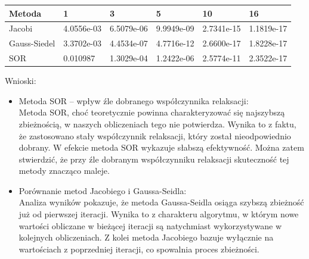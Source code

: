 \documentclass[a4paper, 11pt]{article}
\begin{document}
\begin{center}
\begin{tabular}{|l|l|l|l|l|l|}
\hline
Metoda       & 1          & 3          & 5          & 10         & 16         \\ \hline
Jacobi       & 4.0556e-03 & 6.5079e-06 & 9.9949e-09 & 2.7341e-15 & 1.1819e-17 \\ \hline
Gauss-Siedel & 3.3702e-03 & 4.4534e-07 & 4.7716e-12 & 2.6600e-17 & 1.8228e-17 \\ \hline
SOR          & 0.010987   & 1.3029e-04 & 1.2422e-06 & 2.5774e-11 & 2.3522e-17 \\ \hline
\end{tabular}
\end{center}
Wnioski:
\begin{itemize}
    \item Metoda SOR – wpływ źle dobranego współczynnika relaksacji:\\
    Metoda SOR, choć teoretycznie powinna charakteryzować się najszybszą zbieżnością, w naszych obliczeniach tego nie potwierdza. Wynika to z faktu, że zastosowano stały współczynnik relaksacji, który został nieodpowiednio dobrany. W efekcie metoda SOR wykazuje słabszą efektywność. Można zatem stwierdzić, że przy źle dobranym współczynniku relaksacji skuteczność tej metody znacząco maleje.
    \item Porównanie metod Jacobiego i Gaussa-Seidla:\\
    Analiza wyników pokazuje, że metoda Gaussa-Seidla osiąga szybszą zbieżność już od pierwszej iteracji. Wynika to z charakteru algorytmu, w którym nowe wartości obliczane w bieżącej iteracji są natychmiast wykorzystywane w kolejnych obliczeniach. Z kolei metoda Jacobiego bazuje wyłącznie na wartościach z poprzedniej iteracji, co spowalnia proces zbieżności.
\end{itemize}
\end{document}

